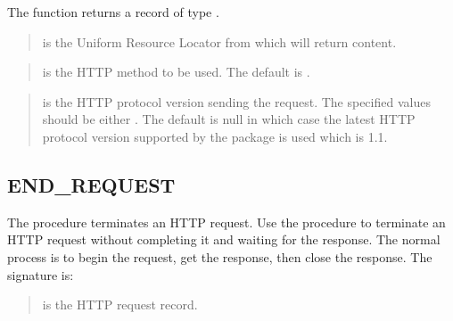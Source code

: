 \documentclass[letterpaper,10pt,english,openany,oneside]{sphinxmanual}
\begin{document}
The  function returns a record of type .


\begin{quote}

 is the Uniform Resource Locator from which  will
return content.
\end{quote}

\begin{quote}

 is the HTTP method to be used. The default is .
\end{quote}

\begin{quote}

 is the HTTP protocol version sending the request.
The specified values should be either . The
default is null in which case the latest HTTP protocol version
supported by the  package is used which is 1.1.
\end{quote}


\subsection{END\_REQUEST}
\label{\detokenize{utl_http:end-request}}
The  procedure terminates an HTTP request. Use the
 procedure to terminate an HTTP request without completing
it and waiting for the response. The normal process is to begin the
request, get the response, then close the response. The signature is:
\begin{quote}

\end{quote}


\begin{quote}

 is the HTTP request record.
\end{quote}
\end{document}
